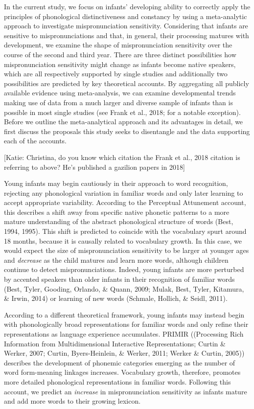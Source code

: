 \documentclass[man]{apa6}
\theoremstyle{definition}
\theoremstyle{definition}
\theoremstyle{definition}
\theoremstyle{remark}
\begin{document}
In the current study, we focus on infants' developing ability to
correctly apply the principles of phonological distinctiveness and
constancy by using a meta-analytic approach to investigate
mispronunciation sensitivity. Considering that infants are sensitive to
mispronunciations and that, in general, their processing matures with
development, we examine the shape of mispronunciation sensitivity over
the course of the second and third year. There are three distinct
possibilities how mispronunciation sensitivity might change as infants
become native speakers, which are all respectively supported by single
studies and additionally two possibilities are predicted by key
theoretical accounts. By aggregating all publicly available evidence
using meta-analysis, we can examine developmental trends making use of
data from a much larger and diverse sample of infants than is possible
in most single studies (see Frank et al., 2018; for a notable
exception). Before we outline the meta-analytical approach and its
advantages in detail, we first discuss the proposals this study seeks to
disentangle and the data supporting each of the accounts.

{[}Katie: Christina, do you know which citation the Frank et al., 2018
citation is referring to above? He's published a gazilion papers in
2018{]}

Young infants may begin cautiously in their approach to word
recognition, rejecting any phonological variation in familiar words and
only later learning to accept appropriate variability. According to the
Perceptual Attunement account, this describes a shift away from specific
native phonetic patterns to a more mature understanding of the abstract
phonological structure of words (Best, 1994, 1995). This shift is
predicted to coincide with the vocabulary spurt around 18 months,
because it is causally related to vocabulary growth. In this case, we
would expect the size of mispronunciation sensitivity to be larger at
younger ages and \emph{decrease} as the child matures and learn more
words, although children continue to detect mispronunciations. Indeed,
young infants are more perturbed by accented speakers than older infants
in their recognition of familiar words (Best, Tyler, Gooding, Orlando,
\& Quann, 2009; Mulak, Best, Tyler, Kitamura, \& Irwin, 2014) or
learning of new words (Schmale, Hollich, \& Seidl, 2011).

According to a different theoretical framework, young infants may
instead begin with phonologically broad representations for familiar
words and only refine their representations as language experience
accumulates. PRIMIR ((Processing Rich Information from Multidimensional
Interactive Representations; Curtin \& Werker, 2007; Curtin,
Byers-Heinlein, \& Werker, 2011; Werker \& Curtin, 2005)) describes the
development of phonemic categories emerging as the number of word
form-meaning linkages increases. Vocabulary growth, therefore, promotes
more detailed phonological representations in familiar words. Following
this account, we predict an \emph{increase} in mispronunciation
sensitivity as infants mature and add more words to their growing
lexicon.
\end{document}
